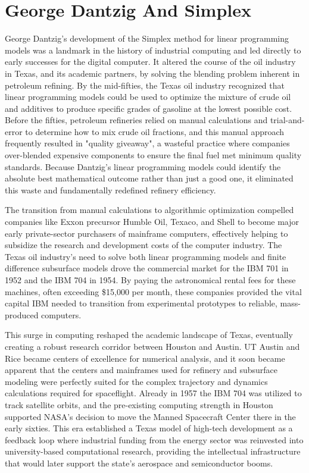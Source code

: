 \chapter{George Dantzig And Simplex}

George Dantzig’s development of the Simplex method for linear programming models was a landmark in the history of industrial computing and led directly to early successes for the digital computer. It altered the course of the oil industry in Texas, and its academic partners, by solving the blending problem inherent in petroleum refining. By the mid-fifties, the Texas oil industry recognized that linear programming models could be used to optimize the mixture of crude oil and additives to produce specific grades of gasoline at the lowest possible cost. Before the fifties, petroleum refineries relied on manual calculations and trial-and-error to determine how to mix crude oil fractions, and this manual approach frequently resulted in "quality giveaway", a wasteful practice where companies over-blended expensive components to ensure the final fuel met minimum quality standards. Because Dantzig's linear programming models could identify the absolute best mathematical outcome rather than just a good one, it eliminated this waste and fundamentally redefined refinery efficiency. \cite{charnesBlendingAviationGasolines1952} \cite{symondsLinearProgrammingSolution1955}

The transition from manual calculations to algorithmic optimization compelled companies like Exxon precursor Humble Oil, Texaco, and Shell to become major early private-sector purchasers of mainframe computers, effectively helping to subsidize the research and development costs of the computer industry. The Texas oil industry's need to solve both linear programming models and finite difference subsurface models drove the commercial market for the IBM 701 in 1952 and the IBM 704 in 1954. By paying the astronomical rental fees for these machines, often exceeding \$15,000 per month, these companies provided the vital capital IBM needed to transition from experimental prototypes to reliable, mass-produced computers. \cite{garvinApplicationsLinearProgramming1957} \cite{enosPetroleumProgressProfits1962}

This surge in computing reshaped the academic landscape of Texas, eventually creating a robust research corridor between Houston and Austin. UT Austin and Rice became centers of excellence for numerical analysis, and it soon became apparent that the centers and mainframes used for refinery and subsurface modeling were perfectly suited for the complex trajectory and dynamics calculations required for spaceflight. Already in 1957 the IBM 704 was utilized to track satellite orbits, and the pre-existing computing strength in Houston supported NASA's decision to move the Manned Spacecraft Center there in the early sixties. This era established a Texas model of high-tech development as a feedback loop where industrial funding from the energy sector was reinvested into university-based computational research, providing the intellectual infrastructure that would later support the state's aerospace and semiconductor booms. \cite{larsonHistoryHumbleOil1959} 

